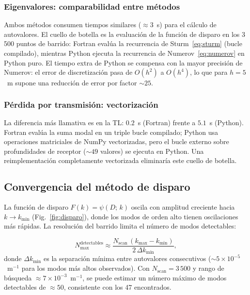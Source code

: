 \documentclass[12pt,a4paper]{article}
\begin{document}
\subsubsection{Eigenvalores: comparabilidad entre métodos}

Ambos métodos consumen tiempos similares ($\approx 3$~s) para el cálculo de
autovalores. El cuello de botella es la evaluación de la función de disparo
en los 3\,500 puntos de barrido: Fortran evalúa la recurrencia de
Sturm~\eqref{eq:sturm} (bucle compilado), mientras Python ejecuta la
recurrencia de Numerov~\eqref{eq:numerov} en Python puro. El tiempo extra de
Python se compensa con la mayor precisión de Numerov: el error de
discretización pasa de $O(h^2)$ a $O(h^4)$, lo que para $h=5$~m supone una
reducción de error por factor $\sim 25$.

\subsubsection{Pérdida por transmisión: vectorización}

La diferencia más llamativa es en la TL: $0.2$~s (Fortran) frente a $5.1$~s
(Python). Fortran evalúa la suma modal en un triple bucle compilado; Python
usa operaciones matriciales de NumPy vectorizadas, pero el bucle externo sobre
profundidades de receptor ($\sim 49$ valores) se ejecuta en Python. Una
reimplementación completamente vectorizada eliminaría este cuello de botella.

\subsection{Convergencia del método de disparo}

La función de disparo $F(k) = \psi(D;\,k)$ oscila con amplitud creciente
hacia $k \to k_{\min}$ (Fig.~\ref{fig:disparo}), donde los modos de orden
alto tienen oscilaciones más rápidas. La resolución del barrido limita el
número de modos detectables:

\begin{equation}
  N_{\max}^{\text{detectables}} \approx \frac{N_{\text{scan}}\,(k_{\max}-k_{\min})}{2\,\Delta k_{\min}},
\end{equation}
donde $\Delta k_{\min}$ es la separación mínima entre autovalores consecutivos
($\sim 5\times10^{-5}$~m$^{-1}$ para los modos más altos observados).
Con $N_{\text{scan}}=3\,500$ y rango de búsqueda $\approx 7\times10^{-3}$~m$^{-1}$,
se puede estimar un número máximo de modos detectables de $\approx 50$, consistente
con los 47 encontrados.
\end{document}
